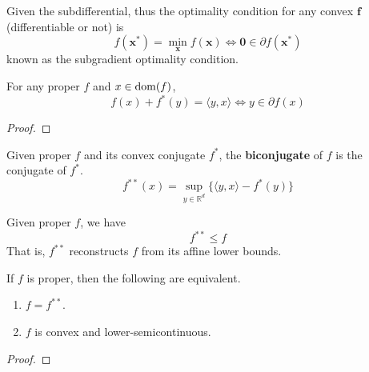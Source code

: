   Given the subdifferential, thus the optimality condition for any convex $\mathbf{f}$ (differentiable or not) is
  \begin{equation}
    f(\mathbf{x}^\ast) = \min_{\mathbf{x}} f(\mathbf{x}) \iff \mathbf{0} \in \partial f(\mathbf{x}^\ast)
  \end{equation}
  known as the subgradient optimality condition. 

	\begin{theorem}
	  \label{thm:equality-in-fenchel-young}
	  For any proper $f$ and $x \in \operatorname{dom}(f)$, 
		\begin{equation}
		  f(x) + f^\ast (y) = \langle y, x \rangle \iff y \in \partial f(x)
		\end{equation}
	\end{theorem}
	\begin{proof}
	  
	\end{proof}

	\begin{definition}[Biconjugate]
	  \label{def:biconjugate}
		Given proper $f$ and its convex conjugate $f^\ast$, the \textbf{biconjugate} of $f$ is the conjugate of $f^\ast$. 
		\begin{equation}
			f^{\ast\ast} (x) = \sup_{y \in \mathbb{R}^d} \{ \langle y, x \rangle - f^\ast (y) \}
		\end{equation}
	\end{definition}

	\begin{corollary}
	  \label{thm:affine-lower-bound-reconstruction}
		Given proper $f$, we have 
		\begin{equation}
			f^{\ast\ast} \leq f
		\end{equation}
		That is, $f^{\ast\ast}$ reconstructs $f$ from its affine lower bounds. 
	\end{corollary}

	\begin{theorem}
	  \label{thm:fenchel-moreau}
	  If $f$ is proper, then the following are equivalent. 
		\begin{enumerate}
			\item $f = f^{\ast\ast}$. 
			\item $f$ is convex and lower-semicontinuous. 
		\end{enumerate}
	\end{theorem}
	\begin{proof}
	  
	\end{proof}

